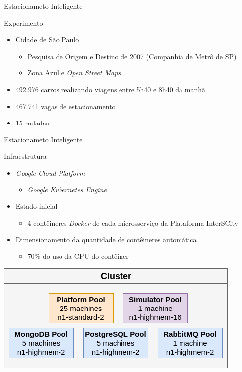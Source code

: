 \documentclass[xcolor={usenames,svgnames,dvipsnames},brazil,english,12pt,aspectratio=149]{beamer}
\begin{document}
\begin{frame}{Estacionameto Inteligente}
    \begin{block}{Experimento}
        \begin{itemize}
            \item Cidade de São Paulo
                \begin{itemize}
                    \item Pesquisa de Origem e Destino de 2007 (Companhia de Metrô de SP)
                    \item Zona Azul e \textit{Open Street Maps}
                \end{itemize}
            \item 492.976 carros realizando viagens entre 5h40 e 8h40 da manhã
            \item 467.741 vagas de estacionamento
            \item 15 rodadas
        \end{itemize}
    \end{block}
\end{frame}

\begin{frame}{Estacionameto Inteligente}
    \begin{block}{Infraestrutura}
        \begin{itemize}
            \item \textit{Google Cloud Platform}
                \begin{itemize}
                    \item \textit{Google Kubernetes Engine}
                \end{itemize}
            \item Estado inicial
                \begin{itemize}
                    \item 4 contêineres \textit{Docker} de cada microsserviço da Plataforma InterSCity
                \end{itemize}
            \item Dimensionamento da quantidade de contêineres automática
                \begin{itemize}
                    \item 70\% do uso da CPU do contêiner
                \end{itemize}
        \end{itemize}
    \end{block}

    \begin{center}
        \includegraphics[width=.4\textwidth]{node-pools.png}
    \end{center}
\end{frame}
\end{document}

